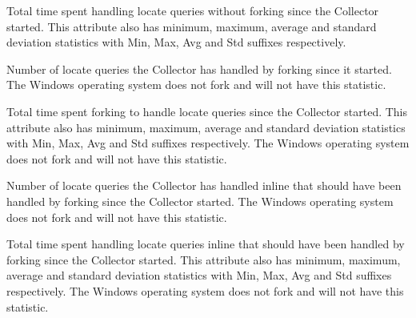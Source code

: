 \begin{description}
\item[\AdAttr{HandleLocateRuntime}:] Total time spent handling locate queries without forking since the Collector started.
This attribute also has minimum, maximum, average and standard deviation statistics with Min, Max, Avg and Std suffixes respectively.

\item[\AdAttr{HandleLocateForked}:] Number of locate queries the Collector has handled by forking since it started.
The Windows operating system does not fork and will not have this statistic.

\item[\AdAttr{HandleLocateForkedRuntime}:] Total time spent forking to handle locate queries since the Collector started.
This attribute also has minimum, maximum, average and standard deviation statistics with Min, Max, Avg and Std suffixes respectively.
The Windows operating system does not fork and will not have this statistic.

\item[\AdAttr{HandleLocateMissedFork}:] Number of locate queries the Collector has handled inline that should have been handled by forking since the Collector started.
The Windows operating system does not fork and will not have this statistic.

\item[\AdAttr{HandleLocateMissedForkRuntime}:] Total time spent handling locate queries inline that should have been handled by forking since the Collector started.
This attribute also has minimum, maximum, average and standard deviation statistics with Min, Max, Avg and Std suffixes respectively.
The Windows operating system does not fork and will not have this statistic.


\end{description}
